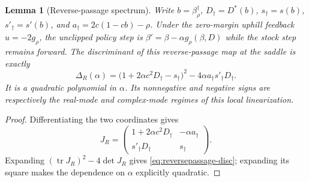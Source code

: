 \documentclass[11pt]{article}
\newtheorem{lemma}[theorem]{Lemma}
\theoremstyle{definition}
\theoremstyle{remark}
\numberwithin{equation}{section}
\begin{document}
\begin{lemma}[Reverse-passage spectrum]\label{lem:reversepassage}
Write $b=\beta^\dagger_\rho$, $D_\dagger=D^\ast(b)$,
$s_\dagger=s(b)$, $s'_\dagger=s'(b)$, and
$a_\dagger=2c(1-cb)-\rho$. Under the zero-margin uphill feedback
$u=-2g_\rho$, the unclipped policy step is
$\beta'=\beta-\alpha g_\rho(\beta,D)$ while the stock step remains forward.
The discriminant of this reverse-passage map at the saddle is exactly
\begin{equation}\label{eq:reversepassage-disc}
\Delta_R(\alpha)
=\bigl(1+2\alpha c^2D_\dagger-s_\dagger\bigr)^2
 -4\alpha a_\dagger s'_\dagger D_\dagger .
\end{equation}
It is a quadratic polynomial in $\alpha$. Its nonnegative and negative signs
are respectively the real-mode and complex-mode regimes of this local
linearization.
\end{lemma}
\begin{proof}
Differentiating the two coordinates gives
\[
J_R=
\begin{pmatrix}
1+2\alpha c^2D_\dagger&-\alpha a_\dagger\\
s'_\dagger D_\dagger&s_\dagger
\end{pmatrix}.
\]
Expanding $(\operatorname{tr}J_R)^2-4\det J_R$ gives
\eqref{eq:reversepassage-disc}; expanding its square makes the dependence on
$\alpha$ explicitly quadratic.
\end{proof}
\end{document}
